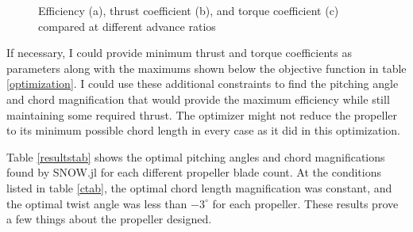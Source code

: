 \documentclass[journal ]{new-aiaa}
\begin{document}
\begin{figure}[H]
\centering

	\hspace{1em}
	\caption{Efficiency (a), thrust coefficient (b), and torque coefficient (c) compared at different advance ratios}
	\captionsetup{aboveskip=0pt,font=it}
	\label{efftqtab}
\end{figure}

If necessary, I could provide minimum thrust and torque coefficients as parameters along with the maximums shown below the objective function in table \ref{optimization}. I could use these additional constraints to find the pitching angle and chord magnification that would provide the maximum efficiency while still maintaining some required thrust. The optimizer might not reduce the propeller to its minimum possible chord length in every case as it did in this optimization.

Table \ref{resultstab} shows the optimal pitching angles and chord magnifications found by SNOW.jl for each different propeller blade count. At the conditions listed in table \ref{ctab}, the optimal chord length magnification was constant, and the optimal twist angle was less than $-3^{\circ}$ for each propeller. These results prove a few things about the propeller designed.
\end{document}
